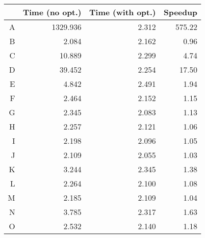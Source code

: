 \begin{table}  \begin{center}
\begin{tabular}{ l r r r }
\toprule
\multicolumn{1}{r|}{} & Time (no opt.) & Time (with opt.) & Speedup \\
\midrule
\multicolumn{1}{r|}{A} & 1329.936 & 2.312 & 575.22 \\
\multicolumn{1}{r|}{B} & 2.084 & 2.162 & 0.96 \\
\multicolumn{1}{r|}{C} & 10.889 & 2.299 & 4.74 \\
\multicolumn{1}{r|}{D} & 39.452 & 2.254 & 17.50 \\
\multicolumn{1}{r|}{E} & 4.842 & 2.491 & 1.94 \\
\multicolumn{1}{r|}{F} & 2.464 & 2.152 & 1.15 \\
\multicolumn{1}{r|}{G} & 2.345 & 2.083 & 1.13 \\
\multicolumn{1}{r|}{H} & 2.257 & 2.121 & 1.06 \\
\multicolumn{1}{r|}{I} & 2.198 & 2.096 & 1.05 \\
\multicolumn{1}{r|}{J} & 2.109 & 2.055 & 1.03 \\
\multicolumn{1}{r|}{K} & 3.244 & 2.345 & 1.38 \\
\multicolumn{1}{r|}{L} & 2.264 & 2.100 & 1.08 \\
\multicolumn{1}{r|}{M} & 2.185 & 2.109 & 1.04 \\
\multicolumn{1}{r|}{N} & 3.785 & 2.317 & 1.63 \\
\multicolumn{1}{r|}{O} & 2.532 & 2.140 & 1.18 \\
\bottomrule
\end{tabular}
\end{center}

\end{table}
